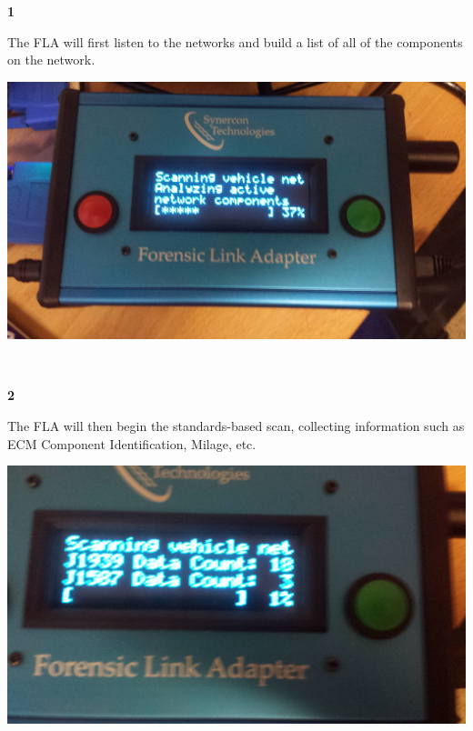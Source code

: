 \documentclass[11pt]{article}
\begin{document}
\noindent\begin{minipage}{0.3\textwidth}%
\begin{center}
\textbf{1}\\[\baselineskip]
\end{center}
The FLA will first listen to the
networks and build a list of all
of the components on the network.
\end{minipage}%
\hfill%
\begin{minipage}{0.6\textwidth}
\includegraphics[width=\linewidth]{../media/fla_screens/scan_1}
\end{minipage}
\\[\baselineskip]
\noindent\begin{minipage}{0.3\textwidth}%
\begin{center}
\textbf{2}\\[\baselineskip]
\end{center}
The FLA will then begin the standards-based scan, collecting information such as ECM Component Identification, Milage, etc.
\end{minipage}%
\hfill%
\begin{minipage}{0.6\textwidth}
\includegraphics[width=\linewidth]{../media/fla_screens/scan_2}
\end{minipage}
\end{document}
